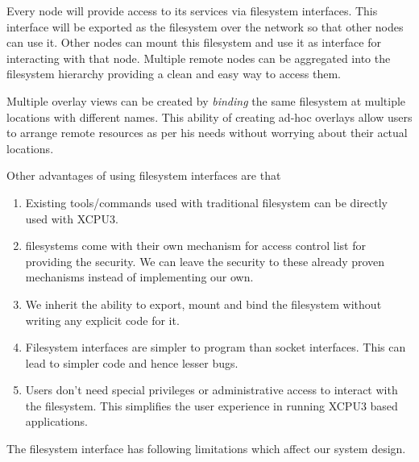 \documentclass{sig-alternate}
\begin{document}
Every node will provide access to its services via filesystem interfaces.
This interface will be exported as the filesystem over the network so that other
nodes can use it. Other nodes can mount this filesystem and use it as
interface for interacting with that node.  Multiple remote nodes can be
aggregated into the filesystem hierarchy providing a clean and easy way to
access them.

Multiple overlay views can be created by \textit{binding} the same filesystem
at multiple locations with different names.  This ability of creating ad-hoc
overlays allow users to arrange remote resources as per his needs without
worrying about their actual locations.

Other advantages of using filesystem interfaces are that 
\begin{enumerate}
\item Existing tools/commands used with traditional filesystem can be directly
used with XCPU3.

\item filesystems come with their own mechanism for access control list for
providing the security.  We can leave the security to these already proven 
mechanisms instead of implementing our own.

\item We inherit the ability to export, mount and bind the filesystem
without writing any explicit code for it.

\item Filesystem interfaces are simpler to program than socket interfaces.  This
can lead to simpler code and hence lesser bugs.

\item Users don't need special privileges or administrative access to interact
with the filesystem.  This simplifies the user experience in running XCPU3 based
applications.
\end{enumerate}

The filesystem interface has following limitations which affect our system
design.
\end{document}
